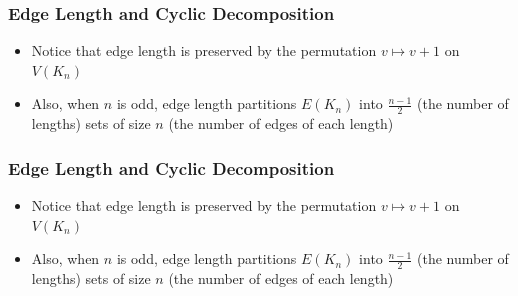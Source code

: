 \documentclass[11pt,serif,professionalfont,aspectratio=169]{beamer}
\newcommand{\vertex}{\node[vertex]}
\theoremstyle{plain}
\begin{document}
\begin{frame}
\frametitle{Edge Length and Cyclic Decomposition}
\begin{itemize}
    \item Notice that edge length is preserved by the permutation $v\mapsto v+1$ on $V(K_n)$
    \item Also, when $n$ is odd, edge length partitions $E(K_n)$ into $\frac{n-1}{2}$ (the number of lengths) sets of size $n$ (the number of edges of each length) 
\end{itemize}
\begin{center}
\end{center}
    
\end{frame}
\begin{frame}
\frametitle{Edge Length and Cyclic Decomposition}
\begin{itemize}
    \item Notice that edge length is preserved by the permutation $v\mapsto v+1$ on $V(K_n)$
    \item Also, when $n$ is odd, edge length partitions $E(K_n)$ into $\frac{n-1}{2}$ (the number of lengths) sets of size $n$ (the number of edges of each length) 
\end{itemize}
\begin{center}
\end{center}
    
\end{frame}
\end{document}
